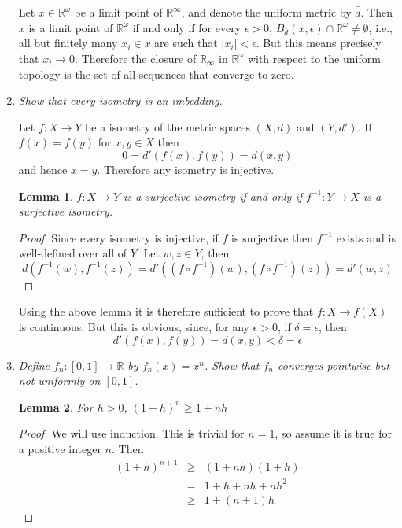 \documentclass[10pt]{article}
\newcommand{\R}{\mathbb{R}}
\newtheorem{lemma}{Lemma}
\begin{document}
\begin{enumerate}
Let $x \in \R^\omega$ be a limit point of $\R^\infty$, and denote the uniform metric by $\bar{d}$.  Then $x$ is a limit point of $\R^\omega$ if and only if for every $\epsilon > 0$, $B_{\bar{d}}(x, \epsilon) \cap \R^\omega \neq \emptyset$, i.e., all but finitely many $x_i \in x$ are such that $|x_i| < \epsilon$.  But this means precisely that $x_i \rightarrow 0$.  Therefore the closure of $\R_\infty$ in $\R^\omega$ with respect to the uniform topology is the set of all sequences that converge to zero.

\item \emph{Show that every isometry is an imbedding.}

Let $f: X \rightarrow Y$ be a isometry of the metric spaces $(X, d)$ and $(Y,d')$.  If $f(x) = f(y)$ for $x,y \in X$ then $$0 = d'(f(x), f(y)) = d(x,y)$$
and hence $x = y$.  Therefore any isometry is injective.

\begin{lemma}$f: X \rightarrow Y$ is a surjective isometry if and only if $f^{-1}: Y \rightarrow X$ is a surjective isometry.\end{lemma}\label{surjective_isometry}
\begin{proof}
Since every isometry is injective, if $f$ is surjective then $f^{-1}$ exists and is well-defined over all of $Y$.  Let $w,z \in Y$, then
\[
d(f^{-1}(w), f^{-1}(z)) = d'((f \circ f^{-1})(w), (f \circ f^{-1})(z)) = d'(w,z)
\]
\end{proof}

Using the above lemma it is therefore sufficient to prove that $f: X \rightarrow f(X)$ is continuous.  But this is obvious, since, for any $\epsilon > 0$, if $\delta = \epsilon$, then $$d'(f(x), f(y)) = d(x,y) < \delta = \epsilon$$

\item \emph{Define $f_n: [0,1] \rightarrow \R$ by $f_n(x) = x^n$.  Show that $f_n$ converges pointwise but not uniformly on $[0,1]$.}

\begin{lemma}
\label{polynomial_diverge}
For $h > 0$, $(1+h)^n \geq 1 + nh$
\end{lemma}

\begin{proof}
We will use induction.  This is trivial for $n=1$, so assume it is true for a positive integer $n$.  Then
\begin{eqnarray*}
(1+h)^{n+1} &\geq& (1+nh)(1+h) \\
&=& 1 + h + nh + nh^2 \\
&\geq& 1 + (n+1)h
\end{eqnarray*}


\end{proof}
\end{enumerate}
\end{document}

